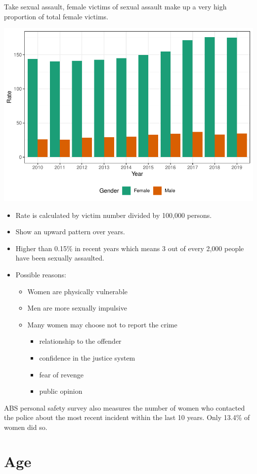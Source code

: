 \documentclass[11pt,a4paper,]{article}
\providecommand{\tightlist}{%
  \setlength{\itemsep}{0pt}\setlength{\parskip}{0pt}}
\begin{document}
Take sexual assault, female victims of sexual assault make up a very high proportion of total female victims.

\includegraphics{report_files/figure-latex/unnamed-chunk-9-1.pdf}

\begin{itemize}
\tightlist
\item
  Rate is calculated by victim number divided by 100,000 persons.
\item
  Show an upward pattern over years.
\item
  Higher than 0.15\% in recent years which means 3 out of every 2,000 people have been sexually assaulted.
\item
  Possible reasons:

  \begin{itemize}
  \tightlist
  \item
    Women are physically vulnerable
  \item
    Men are more sexually impulsive
  \item
    Many women may choose not to report the crime

    \begin{itemize}
    \tightlist
    \item
      relationship to the offender
    \item
      confidence in the justice system
    \item
      fear of revenge
    \item
      public opinion
    \end{itemize}
  \end{itemize}
\end{itemize}

ABS personal safety survey also measures the number of women who contacted the police about the most recent incident within the last 10 years. Only 13.4\% of women did so.

\clearpage

\section*{Age}

\printbibliography
\end{document}
